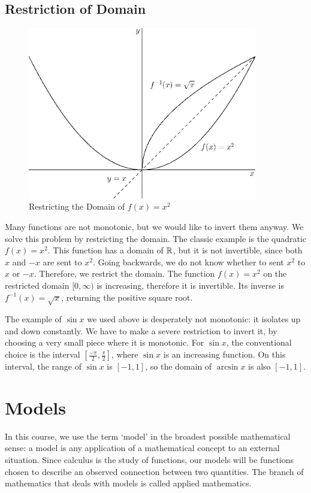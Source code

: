 \documentclass[fleqn]{report}
\begin{document}
\section*{Restriction of Domain}

\begin{figure}[t]
\centering
\includegraphics[width=10cm]{figure36.eps}
\caption{Restricting the Domain of $f(x) = x^2$}
\label{Restriction of Domain}
\end{figure}

Many functions are not monotonic, but we would like to invert
them anyway. We solve this problem by restricting the domain.
The classic example is the quadratic $f(x) = x^2$. This
function has a domain of $\mathbb{R}$, but it is not invertible,
since both $x$ and $-x$ are sent to $x^2$. Going backwards,
we do not know whether to sent $x^2$ to $x$ or $-x$.
Therefore, we restrict the domain. The function $f(x) = x^2$
on the restricted domain $[0, \infty)$ is increasing,
therefore it is invertible. Its inverse is $f^{-1}(x) =
\sqrt{x}$, returning the positive square root.

The example of $\sin x$ we used above is desperately not
monotonic: it isolates up and down constantly. We have to make
a severe restriction to invert it, by choosing a very small
piece where it is monotonic. For $\sin x$, the conventional
choice is the interval $\left[ \frac{-\pi}{2}, \frac{\pi}{2}
\right]$, where $\sin x$ is an increasing function. On this
interval, the range of $\sin x$ is $[-1,1]$, so the domain of
$\arcsin x$ is also $[-1,1]$. 

\chapter{Models}
\label{Models}

In this course, we use the term `model' in the broadest
possible mathematical sense: a model is any application of a
mathematical concept to an external situation.  Since calculus
is the study of functions, our models will be functions chosen
to describe an observed connection between two quantities. The
branch of mathematics that deals with models is called applied
mathematics.
\end{document}
